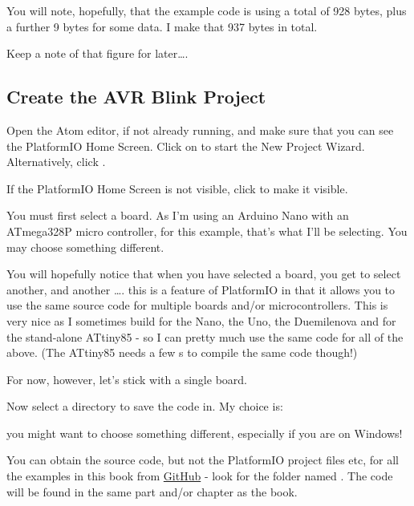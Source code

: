 You will note, hopefully, that the example code is using a total of 928 bytes, plus a further 9 bytes for some data. I make that 937 bytes in total.

Keep a note of that figure for later\ldots{}.

\subsection{Create the AVR Blink Project}\label{create-the-avr-blink-project}

Open the Atom editor, if not already running, and make sure that you can see the PlatformIO Home Screen. Click on  to start the New Project Wizard. Alternatively, click .

If the PlatformIO Home Screen is not visible, click  to make it visible.

You must first select a board. As I'm using an Arduino Nano with an ATmega328P micro controller, for this example, that's what I'll be selecting. You may choose something different.

You will hopefully notice that when you have selected a board, you get to select another, and another \ldots{}. this is a feature of PlatformIO in that it allows you to use the same source code for multiple boards and/or microcontrollers. This is very nice as I sometimes build for the Nano, the Uno, the Duemilenova and for the stand-alone ATtiny85 - so I can pretty much use the same code for all of the above. (The ATtiny85 needs a few s to compile the same code though!)

For now, however, let's stick with a single board.

Now select a directory to save the code in. My choice is:


you might want to choose something different, especially if you are on
Windows!

\begin{note}
You can obtain the source code, but not the PlatformIO project files etc, for all the examples in this book from \href{https://github.com/NormanDunbar/AVRBook}{GitHub} - look for the folder named . The code will be found in the same part and/or chapter as the book.
\end{note}

